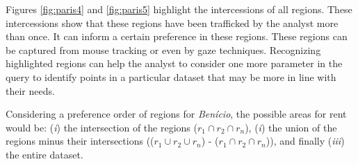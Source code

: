 \documentclass[runningheads,a4paper]{llncs}
\begin{document}
Figures \ref{fig:paris4} and \ref{fig:paris5} highlight the intercessions of all regions. These intercessions show that these regions have been trafficked by the analyst more than once. It can inform a certain preference in these regions. These regions can be captured from mouse tracking or even by gaze techniques. Recognizing highlighted regions can help the analyst to consider one more parameter in the query to identify points in a particular dataset that may be more in line with their needs.

Considering a preference order of regions for \textit{Ben\'icio}, the possible areas for rent would be: (\textit{i}) the intersection of the regions ($r_1 \cap r_2 \cap r_n$), (\textit{i}) the union of the regions minus their intersections (($r_1 \cup r_2 \cup r_n$) - ($r_1 \cap r_2 \cap r_n$)), and finally (\textit{iii}) the entire dataset.
\end{document}
